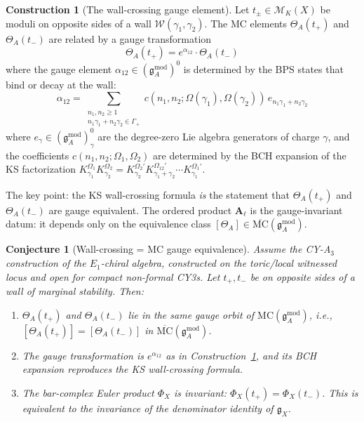\documentclass[11pt]{article}
\newtheorem{conjecture}[theorem]{Conjecture}
\theoremstyle{definition}
\newtheorem{construction}[theorem]{Construction}
\theoremstyle{remark}
\newcommand{\frakg}{\mathfrak{g}}
\newcommand{\MC}{\mathrm{MC}}
\newcommand{\cM}{\mathcal{M}}
\newcommand{\cW}{\mathcal{W}}
\begin{document}
\begin{construction}[The wall-crossing gauge element]
\label{constr:wc-gauge}
Let $t_\pm \in \cM_K(X)$ be moduli on opposite sides of a wall
$\cW(\gamma_1, \gamma_2)$. The MC elements $\Theta_A(t_+)$ and
$\Theta_A(t_-)$ are related by a gauge transformation
\begin{equation}\label{eq:wc-gauge-element}
 \Theta_A(t_+) = e^{\alpha_{12}} \cdot \Theta_A(t_-)
\end{equation}
where the gauge element $\alpha_{12} \in (\frakg^{\mathrm{mod}}_A)^0$
is determined by the BPS states that bind or decay at the wall:
\begin{equation}\label{eq:alpha-formula}
 \alpha_{12}
 = \sum_{\substack{n_1, n_2 \geq 1 \\
 n_1 \gamma_1 + n_2 \gamma_2 \in \Gamma_+}}
 c(n_1, n_2; \Omega(\gamma_1), \Omega(\gamma_2))
 \, e_{n_1 \gamma_1 + n_2 \gamma_2}
\end{equation}
where $e_\gamma \in (\frakg^{\mathrm{mod}}_A)^0_\gamma$ are the
degree-zero Lie algebra generators of charge $\gamma$, and the
coefficients $c(n_1, n_2; \Omega_1, \Omega_2)$ are determined by
the BCH expansion of the KS factorization
$K_{\gamma_1}^{\Omega_1} K_{\gamma_2}^{\Omega_2}
= K_{\gamma_2}^{\Omega_2'} K_{\gamma_1+\gamma_2}^{\Omega_{12}'}
\cdots K_{\gamma_1}^{\Omega_1'}$.
\end{construction}

The key point: the KS wall-crossing formula \emph{is} the statement that
$\Theta_A(t_+)$ and $\Theta_A(t_-)$ are gauge equivalent. The ordered
product $\mathbf{A}_\ell$ is the gauge-invariant datum: it depends only
on the equivalence class $[\Theta_A] \in \overline{\MC}(\frakg^{\mathrm{mod}}_A)$.

\begin{conjecture}[Wall-crossing = MC gauge equivalence]
\label{conj:wc-mc-gauge}
Assume the CY-A$_3$ construction of the $E_1$-chiral algebra, constructed
on the toric/local witnessed locus and open for compact non-formal CY3s.
Let $t_+, t_-$ be on opposite sides of a wall of marginal stability.
Then:
\begin{enumerate}[label=(\roman*)]
\item $\Theta_A(t_+)$ and $\Theta_A(t_-)$ lie in the same gauge orbit of
 $\MC(\frakg^{\mathrm{mod}}_A)$, i.e.,
 $[\Theta_A(t_+)] = [\Theta_A(t_-)]$ in
 $\overline{\MC}(\frakg^{\mathrm{mod}}_A)$.

\item The gauge transformation is $e^{\alpha_{12}}$ as in
 Construction~\ref{constr:wc-gauge}, and its BCH expansion reproduces
 the KS wall-crossing formula.

\item The bar-complex Euler product $\Phi_X$ is invariant:
 $\Phi_X(t_+) = \Phi_X(t_-)$. This is equivalent to the invariance of
 the denominator identity of $\frakg_X$.
\end{enumerate}
\end{conjecture}
\end{document}
